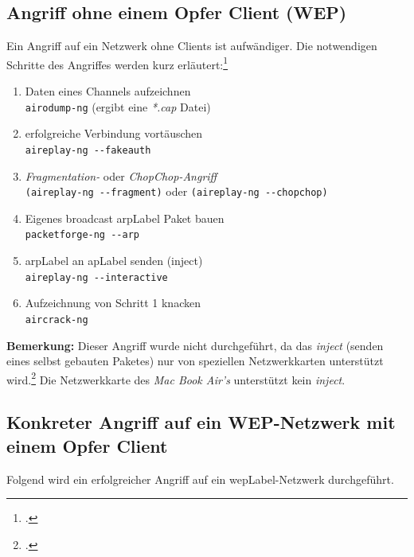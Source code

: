 \subsection{Angriff ohne einem Opfer Client (WEP)}
Ein Angriff auf ein Netzwerk ohne Clients ist aufwändiger.
Die notwendigen Schritte des Angriffes werden kurz erläutert:\footcite[][129ff.]{WrightCache201503}
\begin{enumerate}
	\item Daten eines Channels aufzeichnen\\
	\texttt{airodump-ng} (ergibt eine \textit{*.cap} Datei)

	\item erfolgreiche Verbindung vortäuschen\\
	\texttt{aireplay-ng  -{}-fakeauth}

	\item \textit{Fragmentation-} oder \textit{ChopChop-Angriff}\\
	\texttt{(aireplay-ng -{}-fragment)} oder \texttt{(aireplay-ng -{}-chopchop)}

	\item Eigenes broadcast \gls{arpLabel} Paket bauen\\
	\texttt{packetforge-ng -{}-arp}

	\item \gls{arpLabel} an \gls{apLabel} senden (inject)\\
	\texttt{aireplay-ng -{}-interactive}

	\item Aufzeichnung von Schritt 1 knacken\\
	\texttt{aircrack-ng}

\end{enumerate}

\begin{framed}
	\textbf{Bemerkung:} Dieser Angriff wurde nicht durchgeführt, da das \textit{inject} (senden eines selbst gebauten Paketes) nur von speziellen Netzwerkkarten unterstützt wird.\footcite[][89ff.]{WrightCache201503}
	Die Netzwerkkarte des \textit{Mac Book Air's} unterstützt kein \textit{inject}.
\end{framed}


\subsection{Konkreter Angriff auf ein WEP-Netzwerk mit einem Opfer Client}
\label{sec:wepAttack}
Folgend wird ein erfolgreicher Angriff auf ein \gls{wepLabel}-Netzwerk durchgeführt.

